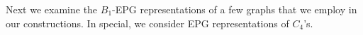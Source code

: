 \documentclass[
submission
]{dmtcs-episciences}
\begin{document}


% 

 
 
 
 
 

Next we examine the $B_1$-EPG representations of a few graphs that we employ in our constructions. In special, we consider EPG representations of $C_4$'s.

\end{document}
